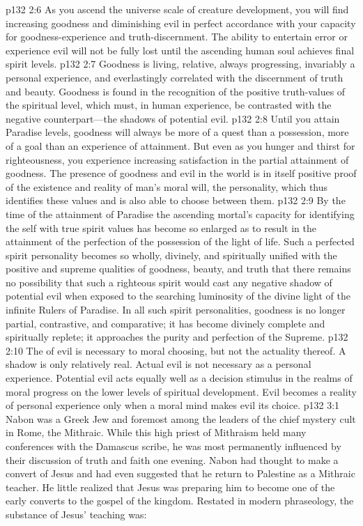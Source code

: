 \pc \vs p132 2:6 As you ascend the universe scale of creature development, you will find increasing goodness and diminishing evil in perfect accordance with your capacity for goodness\hyp{}experience and truth\hyp{}discernment. The ability to entertain error or experience evil will not be fully lost until the ascending human soul achieves final spirit levels.
\vs p132 2:7 Goodness is living, relative, always progressing, invariably a personal experience, and everlastingly correlated with the discernment of truth and beauty. Goodness is found in the recognition of the positive truth\hyp{}values of the spiritual level, which must, in human experience, be contrasted with the negative counterpart---the shadows of potential evil.\plusone
\pc \vs p132 2:8 Until you attain Paradise levels, goodness will always be more of a quest than a possession, more of a goal than an experience of attainment. But even as you hunger and thirst for righteousness, you experience increasing satisfaction in the partial attainment of goodness. The presence of goodness and evil in the world is in itself positive proof of the existence and reality of man’s moral will, the personality, which thus identifies these values and is also able to choose between them.
\vs p132 2:9 By the time of the attainment of Paradise the ascending mortal’s capacity for identifying the self with true spirit values has become so enlarged as to result in the attainment of the perfection of the possession of the light of life. Such a perfected spirit personality becomes so wholly, divinely, and spiritually unified with the positive and supreme qualities of goodness, beauty, and truth that there remains no possibility that such a righteous spirit would cast any negative shadow of potential evil when exposed to the searching luminosity of the divine light of the infinite Rulers of Paradise. In all such spirit personalities, goodness is no longer partial, contrastive, and comparative; it has become divinely complete and spiritually replete; it approaches the purity and perfection of the Supreme.
\vs p132 2:10 The  of evil is necessary to moral choosing, but not the actuality thereof. A shadow is only relatively real. Actual evil is not necessary as a personal experience. Potential evil acts equally well as a decision stimulus in the realms of moral progress on the lower levels of spiritual development. Evil becomes a reality of personal experience only when a moral mind makes evil its choice.
\vs p132 3:1 Nabon was a Greek Jew and foremost among the leaders of the chief mystery cult in Rome, the Mithraic. While this high priest of Mithraism held many conferences with the Damascus scribe, he was most permanently influenced by their discussion of truth and faith one evening. Nabon had thought to make a convert of Jesus and had even suggested that he return to Palestine as a Mithraic teacher. He little realized that Jesus was preparing him to become one of the early converts to the gospel of the kingdom. Restated in modern phraseology, the substance of Jesus’ teaching was:

